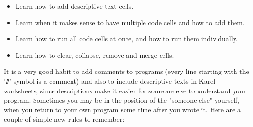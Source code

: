 \begin{itemize}
\item Learn how to add descriptive text cells.
\item Learn when it makes sense to have multiple code cells and how to add them.
\item Learn how to run all code cells at once, and how to run them individually.
\item Learn how to clear, collapse, remove and merge cells.
\end{itemize}
It is a very good habit to add comments to programs (every line starting with the '{\tt \#}'
symbol is a comment) and also to include descriptive 
texts in Karel worksheets, since descriptions make it easier for someone else to 
understand your program. Sometimes you may be in the position of the "someone else" yourself,
when you return to your own program some time after you wrote it. Here are a couple of 
simple new rules to remember:
